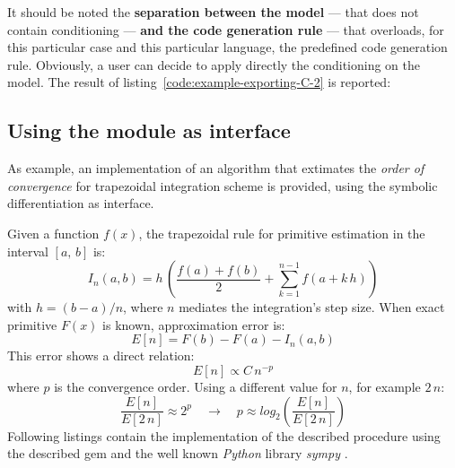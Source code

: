 \noindent%


It should be noted the \textbf{separation between the model} --- that does not contain conditioning --- \textbf{and the code generation rule} --- that overloads, for this particular case and this particular language, the predefined code generation rule. Obviously, a user can decide to apply directly the conditioning on the model. The result of listing~\ref{code:example-exporting-C-2} is reported:

\noindent%
  \begin{minipage}{.5\textwidth}
    
  \end{minipage}\hfill
  \begin{minipage}{.5\textwidth}
    
  \end{minipage}

\subsection{Using the module as interface}
As example, an implementation of an algorithm that extimates the \emph{order of convergence} for trapezoidal integration scheme \cite{weideman2002numerical} is provided, using the symbolic differentiation as interface.

Given a function $f(x)$, the trapezoidal rule for primitive estimation in the interval $[a,\,b]$ is:
\begin{equation}
  I_{n}(a, b) = h\, \left( \dfrac{f(a) + f(b)}{2} +
    \sum\limits_{k = 1}^{n - 1}{f \left( a + k \,h \right)} \right)
\end{equation}
with $h = (b - a) / n $, where $n$ mediates the integration's step size. When exact primitive $F(x)$ is known, approximation error is:
\begin{equation}
  E[n] = F(b) - F(a) - I_{n}(a, b)
\end{equation}
This error shows a direct relation:
\begin{equation}
  E[n] \propto C\,{n}^{-p}
\end{equation}
where $p$ is the convergence order. Using a different value for $n$, for example $2\,n$:
\begin{equation}
  \dfrac{E[n]}{E[2\,n]} \approx 2^{p} \quad \rightarrow \quad p \approx log_2 \left( \dfrac{E[n]}{E[2\,n]} \right)
\end{equation}
Following listings contain the implementation of the described procedure using the described gem and the well known \emph{Python} \cite{van2011python} library \emph{sympy} \cite{christopher_smith_2016_47274}.

